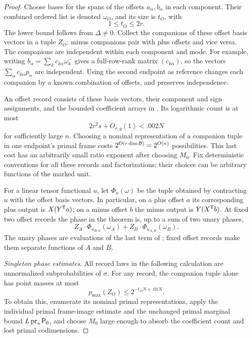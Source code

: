\begin{proof}
Choose bases for the spans of the offsets \(a_\alpha,b_\alpha\)
in each component.  Their combined ordered list is denoted
\(\omega_O\), and its size is \(t_O\), with
\begin{equation}
 1\le t_O\le2r.
 \label{eq:offset-rank}
\end{equation}
The lower bound follows from \(\Delta\ne0\).
Collect the companions of these offset basis vectors in a tuple
\(Z_O\): minus companions pair with plus offsets and vice versa.
The companions are independent within each component and mode.
For example, writing \(b_\alpha=\sum_kc_{k\alpha}\omega_k^-\)
gives a full-row-rank matrix \((c_{k\alpha})\), so the vectors
\(\sum_\alpha c_{k\alpha}p_\alpha\) are independent.
Using the second endpoint as reference changes each companion
by a known combination of offsets, and preserves independence.

An offset record consists of these basis vectors, their component
and sign assignments, and the bounded coefficient arrays in
.  Its logarithmic count is at most
\[
 2r^2s+O_{r,g}(1)<.002N
\]
for sufficiently large \(n\).  Choosing a nominal representation
of a companion tuple in one endpoint's primal frame costs
\(2^{O(r\dim\mathcal B)}=2^{O(n)}\) possibilities.  This last cost has
an arbitrarily small ratio exponent after choosing \(M_0\).
Fix deterministic conventions for all these records and
factorizations; their choices can be arbitrary functions of the
marked unit.

For a linear tensor functional \(u\), let \(\Phi_u(\omega)\)
be the tuple obtained by contracting \(u\) with the offset basis
vectors.  In particular, on a plus offset \(a\) its corresponding
plus output is \(X(Y^{\mathsf T} a)\); on a minus offset \(b\) the
minus output is \(Y(X^{\mathsf T} b)\).  At fixed two offset records
the phase in the theorem is, up to a sum of two unary phases,
\begin{equation}
 Z_A\cdot\Phi_{u_{B,S}}(\omega_A)
 +Z_B\cdot\Phi_{u_{A,R}}(\omega_B).
 \label{eq:offset-walsh}
\end{equation}
The unary phases are evaluations of the last term of
; fixed offset records make them separate
functions of \(A\) and \(B\).

\medskip\noindent
\emph{Singleton phase estimates.}
All record laws in the following calculation are unnormalized
subprobabilities of \(\sigma\).  For any record, the companion
tuple alone has point masses at most
\begin{equation}
 p_{\max}(Z_O)\le2^{-t_ON+.01N}.
 \label{eq:companion-pmax}
\end{equation}
To obtain this, enumerate its nominal primal representations,
apply the individual primal frame-image estimate and the unchanged
primal marginal bound \(L\operatorname{pr}_*{\mathsf P_0}\), and choose \(M_0\) large enough to absorb the
coefficient count and lost primal codimensions.


\end{proof}
